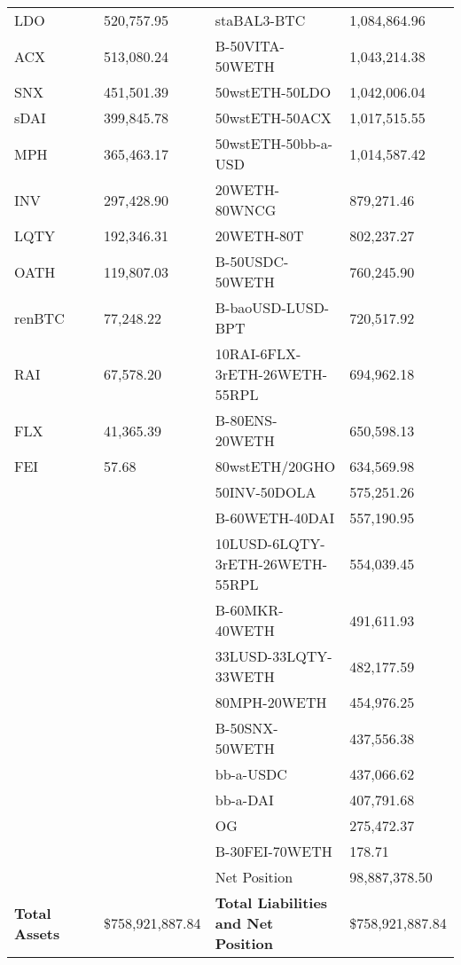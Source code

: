 \begin{longtable}{@{}p{0.25\linewidth}p{0.25\linewidth}p{0.25\linewidth}p{0.25\linewidth}@{}}
LDO & 520,757.95 & staBAL3-BTC & 1,084,864.96 \\
ACX & 513,080.24 & B-50VITA-50WETH & 1,043,214.38 \\
SNX & 451,501.39 & 50wstETH-50LDO & 1,042,006.04 \\
sDAI & 399,845.78 & 50wstETH-50ACX & 1,017,515.55 \\
MPH & 365,463.17 & 50wstETH-50bb-a-USD & 1,014,587.42 \\
INV & 297,428.90 & 20WETH-80WNCG & 879,271.46 \\
LQTY & 192,346.31 & 20WETH-80T & 802,237.27 \\
OATH & 119,807.03 & B-50USDC-50WETH & 760,245.90 \\
renBTC & 77,248.22 & B-baoUSD-LUSD-BPT & 720,517.92 \\
RAI & 67,578.20 & 10RAI-6FLX-3rETH-26WETH-55RPL & 694,962.18 \\
FLX & 41,365.39 & B-80ENS-20WETH & 650,598.13 \\
FEI & 57.68 & 80wstETH/20GHO & 634,569.98 \\
 &  & 50INV-50DOLA & 575,251.26 \\
 &  & B-60WETH-40DAI & 557,190.95 \\
 &  & 10LUSD-6LQTY-3rETH-26WETH-55RPL & 554,039.45 \\
 &  & B-60MKR-40WETH & 491,611.93 \\
 &  & 33LUSD-33LQTY-33WETH & 482,177.59 \\
 &  & 80MPH-20WETH & 454,976.25 \\
 &  & B-50SNX-50WETH & 437,556.38 \\
 &  & bb-a-USDC & 437,066.62 \\
 &  & bb-a-DAI & 407,791.68 \\
 &  & OG & 275,472.37 \\
 &  & B-30FEI-70WETH & 178.71 \\
 &  & Net Position & 98,887,378.50 \\

\midrule

\textbf{Total Assets} & \$758,921,887.84 & \textbf{Total Liabilities and Net Position} & \$758,921,887.84 \\

\bottomrule

\end{longtable}
